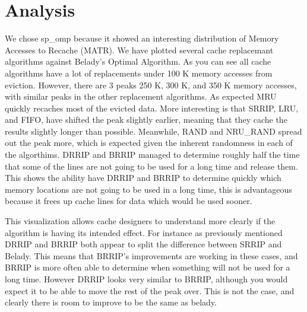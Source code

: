 \section{Analysis}

We chose sp_omp because it showed an interesting distribution of Memory Accesses to Recache (MATR).
	We have plotted several cache replacemant algorithms against Belady's Optimal Algorithm.
	As you can see all cache algorithms have a lot of replacements under 100 K memory accesses from eviction.
	However, there are 3 peaks 250 K, 300 K, and 350 K memory accesses, with similar peaks in the other replacement algorithms.
	As expected MRU quickly recaches most of the evicted data.
	More interesting is that SRRIP, LRU, and FIFO, have shifted the peak slightly earlier, meaning that they cache the results slightly longer than possible.
	Meanwhile, RAND and NRU_RAND spread out the peak more, which is expected given the inherent randomness in each of the algorthims.
	DRRIP and BRRIP managed to determine roughly half the time that some of the lines are not going to be used for a long time and release them.
	This shows the ability have DRRIP and BRRIP to determine quickly which memory locations are not going to be used in a long time,
		this is advantageous because it frees up cache lines for data which would be used sooner.

This visualization allows cache designers to understand more clearly if the algorithm is having its intended effect.
	For instance as previously mentioned DRRIP and BRRIP both appear to split the difference between SRRIP and Belady.
	This means that BRRIP's improvements are working in these cases, and BRRIP is more often able to determine when something will not be used for a long time.
	However DRRIP looks very similar to BRRIP, although you would expect it to be able to move the rest of the peak over.
	This is not the case, and clearly there is room to improve to be the same as belady.

